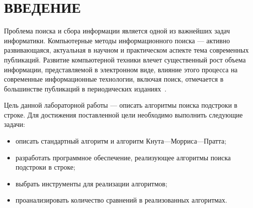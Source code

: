 \chapter*{ВВЕДЕНИЕ}

Проблема поиска и сбора информации является одной из важнейших задач информатики.
Компьютерные методы информационного поиска --- активно развивающаяся, актуальная в научном и практическом аспекте тема современных публикаций. 
Развитие компьютерной техники влечет существенный рост объема информации, представляемой в электронном виде, влияние этого процесса на современные информационные технологии, включая поиск, отмечается в большинстве публикаций в периодических изданиях~\cite{intro}.



Цель данной лабораторной работы --- описать алгоритмы поиска подстроки в строке.
Для достижения поставленной цели необходимо выполнить следующие задачи:
\begin{itemize}
	\item описать стандартный алгоритм и алгоритм Кнута---Морриса---Пратта;
	\item разработать программное обеспечение, реализующее алгоритмы поиска подстроки в строке;
	\item выбрать инструменты для реализации алгоритмов;
	\item проанализировать количество сравнений в реализованных алгоритмах.
\end{itemize}
